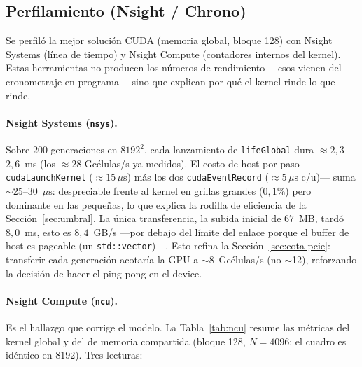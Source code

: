 \documentclass[
	spanish,
	letterpaper, oneside
]{article}
\begin{document}
\subsection{Perfilamiento (Nsight / Chrono)}
\label{sec:profiling}

Se perfiló la mejor solución CUDA (memoria global, bloque 128) con Nsight Systems
(línea de tiempo) y Nsight Compute (contadores internos del kernel). Estas
herramientas no producen los números de rendimiento ---esos vienen del
cronometraje en programa--- sino que explican por qué el kernel rinde lo que
rinde.

\paragraph{Nsight Systems (\texttt{nsys}).} Sobre $200$ generaciones en $8192^2$, cada
lanzamiento de \texttt{lifeGlobal} dura $\approx2{,}3$--$2{,}6$~ms (los $\approx28$
Gcélulas/s ya medidos). El costo de host por paso ---\texttt{cudaLaunchKernel}
($\approx15\,\mu\mathrm{s}$) más los dos \texttt{cudaEventRecord}
($\approx5\,\mu\mathrm{s}$ c/u)--- suma $\sim$25--30~$\mu\mathrm{s}$: despreciable
frente al kernel en grillas grandes ($0{,}1\%$) pero dominante en las pequeñas, lo que
explica la rodilla de eficiencia de la Sección~\ref{sec:umbral}. La única
transferencia, la subida inicial de $67$~MB, tardó $8{,}0$~ms, esto es
$8{,}4$~GB/s ---por debajo del límite del enlace porque el buffer de
host es pageable (un \texttt{std::vector})---. Esto refina la
Sección~\ref{sec:cota-pcie}: transferir cada generación acotaría la GPU a
$\sim$8~Gcélulas/s (no $\sim$12), reforzando la decisión de hacer el ping-pong
en el device.

\paragraph{Nsight Compute (\texttt{ncu}).} Es el hallazgo que corrige el modelo. La
Tabla~\ref{tab:ncu} resume las métricas del kernel global y del de memoria compartida
(bloque 128, $N=4096$; el cuadro es idéntico en $8192$). Tres lecturas:
\end{document}

